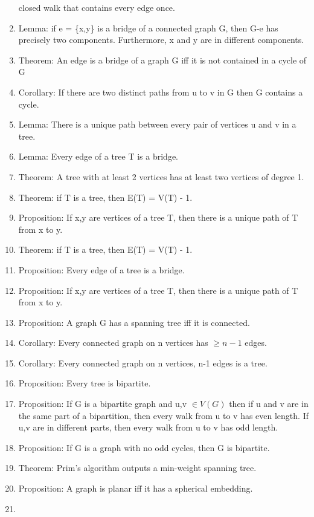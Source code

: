 \documentclass[]{article}
\begin{document}
\begin{enumerate}
  closed walk that contains every edge once.
\item
  Lemma: if e = \{x,y\} is a bridge of a connected graph G, then G-e has
  precisely two components. Furthermore, x and y are in different
  components.
\item
  Theorem: An edge is a bridge of a graph G iff it is not contained in a
  cycle of G
\item
  Corollary: If there are two distinct paths from u to v in G then G
  contains a cycle.
\item
  Lemma: There is a unique path between every pair of vertices u and v
  in a tree.
\item
  Lemma: Every edge of a tree T is a bridge.
\item
  Theorem: A tree with at least 2 vertices has at least two vertices of
  degree 1.
\item
  Theorem: if T is a tree, then \textbar{}E(T)\textbar{} =
  \textbar{}V(T) - 1\textbar{}.
\item
  Proposition: If x,y are vertices of a tree T, then there is a unique
  path of T from x to y.
\item
  Theorem: if T is a tree, then \textbar{}E(T)\textbar{} =
  \textbar{}V(T) - 1\textbar{}.
\item
  Proposition: Every edge of a tree is a bridge.
\item
  Proposition: If x,y are vertices of a tree T, then there is a unique
  path of T from x to y.
\item
  Proposition: A graph G has a spanning tree iff it is connected.
\item
  Corollary: Every connected graph on n vertices has $\geq n-1$ edges.
\item
  Corollary: Every connected graph on n vertices, n-1 edges is a tree.
\item
  Proposition: Every tree is bipartite.
\item
  Proposition: If G is a bipartite graph and u,v $\in V(G)$ then if u
  and v are in the same part of a bipartition, then every walk from u to
  v has even length. If u,v are in different parts, then every walk from
  u to v has odd length.
\item
  Proposition: If G is a graph with no odd cycles, then G is bipartite.
\item
  Theorem: Prim's algorithm outputs a min-weight spanning tree.
\item
  Proposition: A graph is planar iff it has a spherical embedding.
\item

\end{enumerate}
\end{document}
